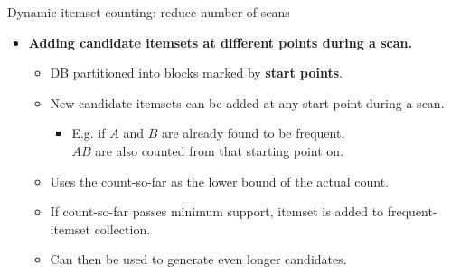 \documentclass[aspectratio=169,t,xcolor=dvipsnames]{beamer}
\begin{document}
  {
    \begin{frame}{Dynamic itemset counting: reduce number of scans}
    \begin{itemize}
      \item \textbf{Adding candidate itemsets at different points during a scan.}
      \begin{itemize}
        \item DB partitioned into blocks marked by \textbf{\color{airforceblue}start points}.
        \item New candidate itemsets can be added at any start point during a scan.
        \begin{itemize}
            \item E.g. if $A$ and $B$ are already found to be frequent, \\
            $AB$ are also counted from that starting point on.
        \end{itemize}
        \item Uses the count-so-far as the lower bound of the actual count.
        \item If count-so-far passes minimum support, itemset is added to frequent-itemset collection.
        \item Can then be used to generate even longer candidates.
      \end{itemize}
    \end{itemize}
    \end{frame}
  }
\end{document}
